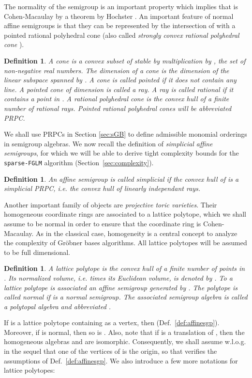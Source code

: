 \documentclass[12pt]{article}
\numberwithin{equation}{section}
\numberwithin{theorem}{section}
\newtheorem{definition}[theorem]{Definition}
\begin{document}
The normality of the semigroup 
is an important property which implies that  is
Cohen-Macaulay by a theorem by Hochster \cite{Hoc72}.
An important feature of normal affine semigroups is that they can be represented by the intersection of  with a pointed rational polyhedral cone (also called \emph{stron\-gly convex rational polyhedral cone} \cite[Sec 1.1]{Oda88}).
\begin{definition}
A \emph{cone}  is a convex subset of  stable by multiplication by , the set of non-negative real numbers. The dimension  of a cone  is the dimension of the linear subspace spanned by . A cone is called \emph{pointed} if it does not contain any line. A pointed cone of dimension  is called a ray. A ray is called \emph{rational} if it contains a point in . A \emph{rational polyhedral cone} is the convex hull of a finite number of rational rays. Pointed rational polyhedral cones will be abbreviated \emph{PRPC}. 
\end{definition}

We shall use PRPCs in Section \ref{sec:sGB} to define admissible
monomial orderings in semigroup algebras.
We now recall the definition of \emph{simplicial affine semigroups}, for which we will be able to derive tight complexity bounds for the {\tt sparse-FGLM} algorithm (Section~\ref{sec:complexity}).

\begin{definition}\label{def:simplicial}
  An affine semigroup  is called simplicial if the convex hull of  is a simplicial PRPC, \emph{i.e.} the convex hull of  linearly independant rays. 
\end{definition}


Another important family of objects are \emph{projective toric
  varieties}. Their homogeneous coordinate rings are associated to a
lattice polytope, which we shall assume to be normal in order to ensure that the coordinate ring is Cohen-Macaulay. As in the classical case, homogeneity is a
central concept to analyze the complexity of Gr\"obner bases
algorithms. All lattice polytopes will be assumed to be full dimensional.

\begin{definition}
A \emph{lattice polytope}  is the convex hull of a
finite number of points in . Its \emph{normalized volume}, \emph{i.e.}  times its Euclidean volume, is
denoted by . 
To a lattice polytope  is associated an affine
semigroup  generated by . The polytope  is called
\emph{normal} if  is a normal semigroup. The
associated semigroup algebra is called a \emph{polytopal algebra} and
abbreviated .
\end{definition}
If  is a lattice polytope containing  as a vertex, then  (Def.~\ref{def:affinesgp}). Moreover, if  is normal, then so is  \cite[Prop. 2.17]{CoxLitSch11}.
Also, note that if  is a translation of , then the homogeneous algebras  and  are isomorphic. Consequently, we shall assume w.l.o.g. in the sequel that one of the vertices of  is the origin, so that  verifies the assumptions of Def.~\ref{def:affinesgp}. We also introduce a few more notations for lattice polytopes:
\end{document}

